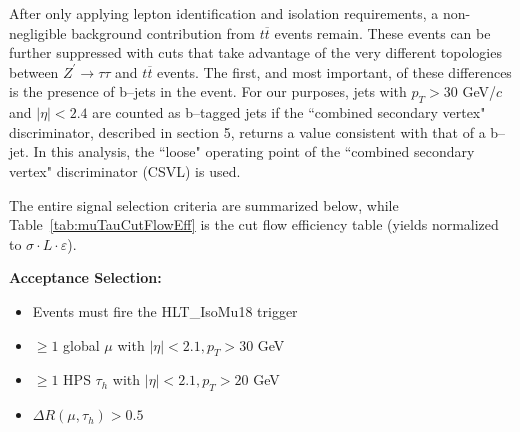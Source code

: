 After only applying lepton identification and isolation requirements, a non-negligible background contribution from $t\overline{t}$ events remain. These events 
can be further suppressed with cuts that take advantage of the very different topologies between $Z^\prime\to\tau\tau$ and $t\overline{t}$ events. The first, and most 
important, of these differences is the presence of b--jets in the event. 
For our purposes, jets with 
$p_{T} > 30$ GeV/$c$ and $|\eta| < 2.4$ are counted as b--tagged jets if the ``combined secondary vertex" discriminator, described in section 5, 
returns a value consistent with that of a b--jet. 
In this analysis, the ``loose" operating point of the ``combined secondary vertex" 
discriminator (CSVL) is used. 

The entire signal selection criteria are summarized below, while Table~\ref{tab:muTauCutFlowEff} is the cut flow efficiency table (yields normalized to $\sigma 
\cdot L \cdot \varepsilon$).

\textbf{Acceptance Selection:}

\begin{itemize}
  \item Events must fire the HLT{\_}IsoMu18 trigger
  \item $\ge 1$ global $\mu$ with $|\eta| < 2.1, p_{T} > 30$ GeV
  \item $\ge 1$ HPS $\tau_{h}$ with $|\eta| < 2.1, p_{T} > 20$ GeV
  \item $\Delta R(\mu,\tau_{h}) > 0.5$
\end{itemize}

